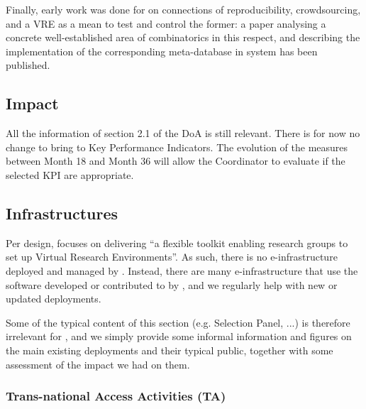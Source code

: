 \documentclass{deliverablereport}
\begin{document}
  Finally, early work was done for  on connections
  of reproducibility, crowdsourcing, and a VRE as a mean to test and control the former: a
  paper \cite{2016arXiv160100181C} analysing a concrete well-established area of
  combinatorics in this respect, and describing the implementation of the corresponding
  meta-database in \Sage system has been published.

  \subsection{Impact}

  All the information of section 2.1 of the DoA is still relevant. There is for now no
  change to bring to Key Performance Indicators. The evolution of the measures between
  Month 18 and Month 36 will allow the Coordinator to evaluate if the selected KPI are
  appropriate.

\subsection{Infrastructures}

Per design, \ODK focuses on delivering ``a flexible toolkit enabling
research groups to set up Virtual Research Environments''. As such,
there is no e-infrastructure deployed and managed by \ODK. Instead,
there are many e-infrastructure that use the software developed or
contributed to by \ODK, and we regularly help with new or updated
deployments.

Some of the typical content of this section (e.g. Selection Panel,
...) is therefore irrelevant for \ODK, and we simply provide some
informal information and figures on the main existing deployments and
their typical public, together with some assessment of the impact we
had on them.


  \subsubsection{Trans-national Access Activities (TA)}

\end{document}
